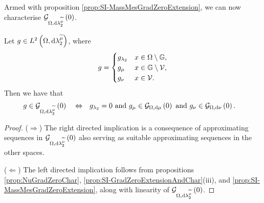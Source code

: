 Armed with proposition \ref{prop:SI-MassMesGradZeroExtension}, we can now characterise $\mathcal{G}_{ \Omega, \mathrm{d}\lambda_2^{\widetilde{\mu}}}\left( 0 \right)$.
\begin{theorem}
	Let $g\in L^{2}\left( \Omega,\mathrm{d} \lambda_2^{\widetilde{\mu}} \right)$, where
	\begin{align*}
		g = \begin{cases} g_{\lambda_2} & x\in\Omega\setminus\mathbb{G}, \\ g_{\mu} & x\in\mathbb{G}\setminus\mathcal{V}, \\ g_{\nu} & x\in\mathcal{V}. \end{cases}
	\end{align*}
	Then we have that
	\begin{align*}
		g\in\mathcal{G}_{ \Omega, \mathrm{d}\lambda_2^{\widetilde{\mu}}}\left( 0 \right)
		\quad\Leftrightarrow\quad &
		g_{\lambda_2} = 0 \text{ and } g_{\mu}\in\mathcal{G}_{ \Omega, \mathrm{d}\mu}\left( 0 \right) \text{ and } g_{\nu}\in\mathcal{G}_{ \Omega, \mathrm{d}\nu}\left( 0 \right).
	\end{align*}
\end{theorem}
\begin{proof}
	($\Rightarrow$) The right directed implication is a consequence of approximating sequences in $\mathcal{G}_{ \Omega, \mathrm{d}\lambda_2^{\widetilde{\mu}}}\left( 0 \right)$ also serving as suitable approximating sequences in the other spaces.
	
	($\Leftarrow$) The left directed implication follows from propositions \ref{prop:NuGradZeroChar}, \ref{prop:SI-GradZeroExtensionAndChar}(iii), and \ref{prop:SI-MassMesGradZeroExtension}, along with linearity of $\mathcal{G}_{ \Omega, \mathrm{d}\lambda_2^{\widetilde{\mu}}}\left( 0 \right)$.
\end{proof}

